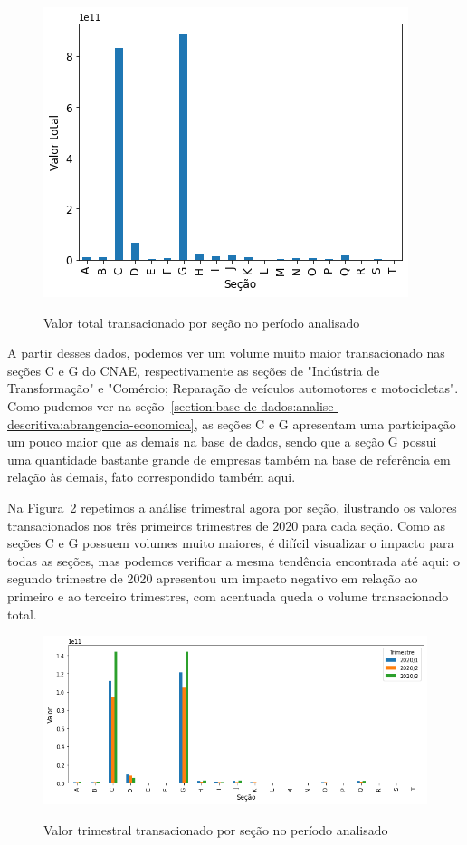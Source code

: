 \begin{figure}[htb]
	\centering
    \caption{Valor total transacionado por seção no período analisado}
    \includegraphics[scale=0.7]{images/base-de-dados-15.1-valor-total-por-secao.png}
    \label{fig:pandemia:base-de-dados-15.1-valor-total-por-secao}
    \fdadospesquisa
\end{figure}

A partir desses dados, podemos ver um volume muito maior transacionado nas seções C e G do CNAE, respectivamente as seções de "Indústria de Transformação" e "Comércio; Reparação de veículos automotores e motocicletas". Como pudemos ver na seção~\ref{section:base-de-dados:analise-descritiva:abrangencia-economica}, as seções C e G apresentam uma participação um pouco maior que as demais na base de dados, sendo que a seção G possui uma quantidade bastante grande de empresas também na base de referência em relação às demais, fato correspondido também aqui.

Na Figura~\ref{fig:pandemia:base-de-dados-22-valor-trimestral-por-secao} repetimos a análise trimestral agora por seção, ilustrando os valores transacionados nos três primeiros trimestres de 2020 para cada seção. Como as seções C e G possuem volumes muito maiores, é difícil visualizar o impacto para todas as seções, mas podemos verificar a mesma tendência encontrada até aqui: o segundo trimestre de 2020 apresentou um impacto negativo em relação ao primeiro e ao terceiro trimestres, com acentuada queda o volume transacionado total.

\begin{figure}[htb]
	\centering
    \caption{Valor trimestral transacionado por seção no período analisado}
    \includegraphics[scale=0.7]{images/base-de-dados-22-valor-trimestral-por-secao.png}
    \label{fig:pandemia:base-de-dados-22-valor-trimestral-por-secao}
    \fdadospesquisa
\end{figure}

